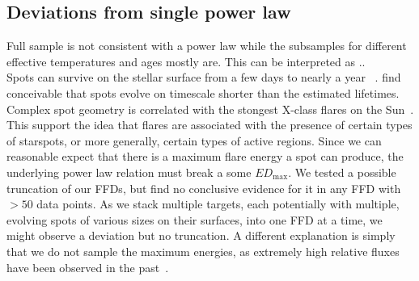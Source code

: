 \documentclass{aa}
\begin{document}
\subsection{Deviations from single power law}
Full sample is not consistent with a power law while the subsamples for different effective temperatures and ages mostly are. This can be interpreted as ..
\\
Spots can survive on the stellar surface from a few days to nearly a year~
\citep{namekata_solarstellarwlf_2017, davenport_flaresandspots_2015}. \citet{namekata_solarstellarwlf_2017} find conceivable that spots evolve on timescale shorter than the estimated lifetimes. Complex spot geometry is correlated with the stongest X-class flares on the Sun~\citep{toriumi_flaresspotssun_2017, sammis_deltaspotsflares_2000}. This support the idea that flares are associated with the presence of certain types of starspots, or more generally, certain types of active regions. Since we can reasonable expect that there is a maximum flare energy a spot can produce, the underlying power law relation must break a some $ED_\mathrm{max}$. We tested a possible truncation of our FFDs, but find no conclusive evidence for it in any FFD with $>50$ data points. As we stack multiple targets, each potentially with multiple, evolving spots of various sizes on their surfaces, into one FFD at a time, we might observe a deviation but no truncation. A different explanation is simply that we do not sample the maximum energies, as extremely high relative fluxes have been observed in the past~\citep{paudel_monsterucdflare_2018, jackman_superflareucd_2019, schmidt_superflareasassn_2016}.
\end{document}
